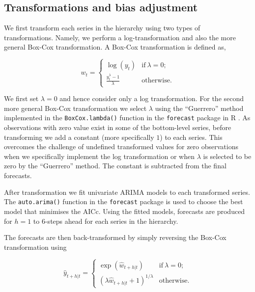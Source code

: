 \documentclass[12pt]{article}
\theoremstyle{definition}
\theoremstyle{property}
\begin{document}
	\subsection{Transformations and bias adjustment}
	
	We first transform each series in the hierarchy using two types of transformations. Namely, we perform a log-transformation and also the more general Box-Cox transformation. A Box-Cox transformation is defined as,
		
\begin{equation} \label{eq:BoxCox_transformation}
	w_t =
	\begin{cases}
	\log(y_t) & \text{if}~\lambda=0;\\
	\frac{y_t^\lambda - 1}{\lambda}  & \text{otherwise}.
	\end{cases}
\end{equation}

We first set $\lambda=0$ and hence consider only a log transformation. For the second more general Box-Cox transformation we select $\lambda$ using the ``Guerrero'' method \citep{guerrero1993time} implemented in the \verb|BoxCox.lambda()| function in the \verb|forecast| package in R \citep{Rforecast}. As observations with zero value exist in some of the bottom-level series, before transforming we add a constant (more specifically $1$) to each series. This overcomes the challenge of undefined transformed values for zero observations when we specifically implement the log transformation or when $\lambda$ is selected to be zero by the ``Guerrero'' method. The constant is subtracted from the final forecasts.

After transformation we fit univariate ARIMA models to each transformed series. The \verb|auto.arima()| function in the \verb|forecast| package is used to choose the best model that minimises the AICc. Using the fitted models, forecasts are produced for $h=1$ to $6$-steps ahead for each series in the hierarchy.

The forecasts are then back-transformed by simply reversing the Box-Cox transformation using

\begin{equation} \label{eq:BoxCox_back-transformation}
	\hat{y}_{t+h|t} =
	\begin{cases}
	\exp({\hat{w}_{t+h|t}}) & \text{if}~\lambda = 0; \\
	(\lambda \hat{w}_{t+h|t} + 1)^{1/\lambda}  & \text{otherwise.}
	\end{cases}
\end{equation}
\end{document}
